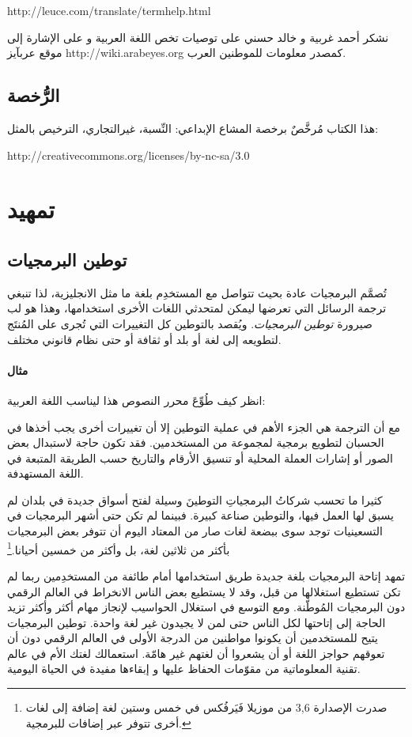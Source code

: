  http://leuce.com/translate/termhelp.html

نشكر أحمد غربية و خالد حسني على توصيات تخص اللغة العربية و على الإشارة
إلى موقع عربآيز http://wiki.arabeyes.org كمصدر معلومات للموطنين العرب.

\section{الرُّخصة}
هذا الكتاب مُرخَّصٌ برخصة المشاع الإبداعي: النِّسبة، غيرالتجاري، الترخيص
بالمثل:

http://creativecommons.org/licenses/by-nc-sa/3.0

\chapter{تمهيد}
\section{توطين البرمجيات}
تُصمَّم البرمجيات عادة بحيث تتواصل مع المستخدِم بلغة ما مثل الانجليزية،
لذا تنبغي ترجمة الرسائل التي تعرضها ليمكن لمتحدثي اللغات الأخرى
استخدامها، وهذا هو لب صيرورة {\it توطين البرمجيات}. ويُقصد بالتوطين كل
التغييرات التي تُجرى على المُنتَج لتطويعه إلى لغة أو بلد أو ثقافة أو
حتى نظام قانوني مختلف.

\subsubsection{مثال}
انظر كيف طُوِّعَ محرر النصوص هذا ليناسب اللغة العربية:



مع أن الترجمة هي الجزء الأهم في عملية التوطين إلا أن تغييرات أخرى يجب
أخذها في الحسبان لتطويع برمجية لمجموعة من المستخدمين. فقد تكون حاجة
لاستبدال بعض الصور أو إشارات العملة المحلية أو تنسيق الأرقام والتاريخ
حسب الطريقة المتبعة في اللغة المستهدفة.

كثيرا ما تحسب شركاتُ البرمجياتِ التوطينَ وسيلة لفتح أسواق جديدة في بلدان
لم يسبق لها العمل فيها، والتوطين صناعة كبيرة. فبينما لم تكن حتى أشهر
البرمجيات في التسعينيات توجد سوى ببضعة لغات صار من المعتاد اليوم أن
تتوفر بعض البرمجيات بأكثر من ثلاثين لغة، بل وأكثر من خمسين
أحيانا.\footnote{صدرت الإصدارة 3,6 من موزيلا فَيَرفُكس في خمس وستين لغة
إضافة إلى لغات أخرى تتوفر عبر إضافات للبرمجية.}

تمهد إتاحة البرمجيات بلغة جديدة طريق استخدامها أمام طائفة من المستخدِمين
ربما لم تكن تستطيع استغلالها من قبل، وقد لا يستطيع بعض الناس الانخراط
في العالم الرقمي دون البرمجيات المُوطّنة. ومع التوسع في استغلال
الحواسيب لإنجاز مهام أكثر وأكثر تزيد الحاجة إلى إتاحتها لكل الناس حتى
لمن لا يجيدون غير لغة واحدة. توطين البرمجيات يتيح للمستخدمين أن يكونوا
مواطنين من الدرجة الأولى في العالم الرقمي دون أن تعوقهم حواجز اللغة أو
أن يشعروا أن لغتهم غير هامّة. استعمالك لغتك الأم في عالم تقنية
المعلوماتية من مقوّمات الحفاظ عليها و إبقاءها مفيدة في الحياة اليومية.

